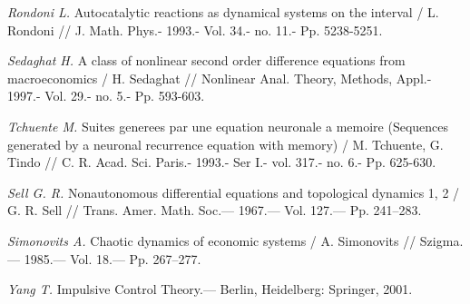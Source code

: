 \begin{thebibliography}{10}
	{\it Rondoni L.} Autocatalytic reactions as dynamical systems on the interval / L. Rondoni // J. Math. Phys.- 1993.- Vol. 34.- no. 11.- Pp. 5238-5251.
	
	{\it Sedaghat H.} A class of nonlinear second order difference equations from macroeconomics / H. Sedaghat // Nonlinear Anal. Theory, Methods, Appl.- 1997.- Vol. 29.- no. 5.- Pp. 593-603.
	
	{\it Tchuente M.} Suites generees par une equation neuronale a memoire (Sequences generated by a neuronal recurrence equation with memory) / M. Tchuente, G. Tindo // C. R. Acad. Sci. Paris.- 1993.- Ser I.- vol. 317.- no. 6.- Pp. 625-630.
	
	{\it Sell G. R.} Nonautonomous differential equations and topological dynamics 1, 2 /
	G. R. Sell // Trans. Amer. Math. Soc.— 1967.— Vol. 127.— Pp. 241–283.
	
	{\it Simonovits A.} Chaotic dynamics of economic systems /
	A. Simonovits // Szigma.— 1985.— Vol. 18.— Pp. 267–277.
	
	{\it Yang T.} Impulsive Control Theory.— Berlin, Heidelberg: Springer, 2001.
	
	
\end{thebibliography} 